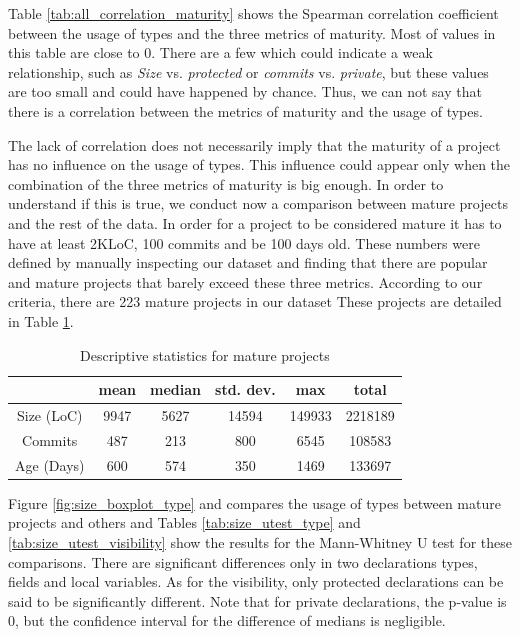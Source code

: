 \documentclass[preprint]{sigplanconf}
\renewcommand{\arraystretch}{1.2}
\begin{document}
Table \ref{tab:all_correlation_maturity} shows the Spearman correlation coefficient between the usage of types and the three metrics of maturity.
Most of values in this table are close to 0.
There are a few which could indicate a weak relationship, such as \emph{Size} vs. \emph{protected} or \emph{commits} vs. \emph{private}, but these values are too small and could have happened by chance.
Thus, we can not say that there is a correlation between the metrics of maturity and the usage of types.


The lack of correlation does not necessarily imply that the maturity of a project has no influence on the usage of types.
This influence could appear only when the combination of the three metrics of maturity is big enough.
In order to understand if this is true, we conduct now a comparison between mature projects and the rest of the data.
In order for a project to be considered mature it has to have at least 2KLoC, 100 commits and be 100 days old.
These numbers were defined by manually inspecting our dataset and finding that there are popular and mature projects that barely exceed these three metrics.
According to our criteria, there are 223 mature projects in our dataset
These projects are detailed in Table \ref{tab:mature_dataset_characterization}.



\begin{table}[h!]

\centering{}%
\renewcommand{\arraystretch}{1.2}

\begin{tabular}{|c|c|c|c|c|c|}
\hline
{}		& mean	& median	& std. dev.	& max	& total		\\
\hline
\hline
Size (LoC)	& 9947 	& 5627 & 14594  & 149933	& 2218189	\\ \hline
Commits   	& 487  	& 213    & 800   & 6545		& 108583	\\ \hline
Age (Days)  & 600  	& 574  & 350   & 1469		& 133697	\\ \hline
\end{tabular}
\caption{Descriptive statistics for mature projects}
\label{tab:mature_dataset_characterization}
\end{table}

Figure \ref{fig:size_boxplot_type}  and \label{fig:size_boxplot_visibility} compares the usage of types between mature projects and others and Tables \ref{tab:size_utest_type} and \ref{tab:size_utest_visibility} show the results for the Mann-Whitney U test for these comparisons.
There are significant differences only in two declarations types, fields and local variables.
As for the visibility, only protected declarations can be said to be significantly different.
Note that for private declarations, the p-value is 0, but the confidence interval for the difference of medians is negligible.
\end{document}
